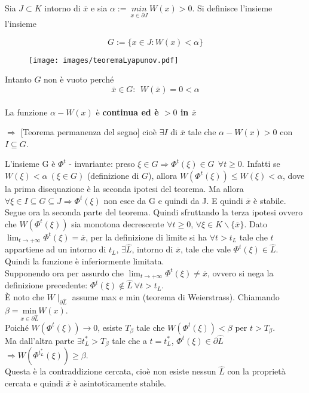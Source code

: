\documentclass[Main.tex]{subfiles}
\begin{document}
\begin{dm}

Sia $J \subset K$ intorno di $\overline x$ e sia $\alpha := \ \underset{x \in \partial J}{min} \ W(x)>0$. Si definisce l'insieme l'insieme

\begin{equation}
  G:= \{ x \in J : W(x) < \alpha \}
\end{equation}

\begin{figure}[H]
    \centering
  \texttt{[image: images/teoremaLyapunov.pdf]}
\end{figure}


Intanto $G$ non è vuoto perché
$$
\overline x \in G: \ \ W ( \overline x)=0< \alpha
$$
\\
La funzione $\alpha - W(x)$ è \textbf{continua ed è $>0$ in $\overline x$} 

$\Rightarrow$ [Teorema permanenza del segno] cioè $\exists I $ di $\overline x$ tale che $\alpha - W(x)>0$ con $I \subseteq G$. 

L'insieme G è $\Phi^t $ - invariante: preso $\xi \in G \Rightarrow \Phi^t(\xi) \in G \ \ \forall t \geq 0$. Infatti se $W(\xi) < \alpha \  (\xi \in G)$ (definizione di $G$), allora $W(\Phi^t(\xi)) \leq W (\xi) < \alpha$, dove la prima disequazione è la seconda ipotesi del teorema.
Ma allora $\forall \xi \in I \subseteq G \subseteq J \Rightarrow \Phi^t (\xi)$ non esce da G e quindi da J. E quindi $\overline x$ è stabile.
\bigskip\\
Segue ora la seconda parte del teorema. Quindi sfruttando la terza ipotesi ovvero che $W(\Phi^t(\xi))$ sia monotona decrescente $\forall t \geq 0$, $\forall \xi \in K \backslash \{\overline x \}$.
Dato $\lim_{t \rightarrow +\infty} \Phi^t (\xi) = \overline x$, per la definizione di limite si ha $\forall t>t_L$ tale che $t$ appartiene ad un intorno di $t_L$, $ \exists \hat{L} $, intorno di $\overline x$, tale che vale $\Phi^t ( \xi) \in \hat{L} $. Quindi la funzione è inferiormente limitata.\\
    Supponendo ora per assurdo che $\lim_{t \rightarrow +\infty} \Phi^t (\xi) \neq \overline x$, ovvero si nega la definizione precedente: $\Phi^t (\xi) \notin \hat{L} ~ \forall t > t_L$.\\
	È noto che $W\mid_{\partial \hat L}$ assume max e min (teorema di Weierstrass). Chiamando $\beta= \underset{x \in \partial \hat L}{\text{min}} W(x)$.\\
	Poiché $W(\Phi^t(\xi)) \rightarrow 0 $, esiste $T_\beta$ tale che $W(\Phi^t(\xi)) < \beta$ per $t >T_\beta$.\\
	Ma dall'altra parte $\exists t^*_L>T_\beta$ tale che a $t=t_L^*$, $\Phi^t (\xi) \in \partial \hat L $ $\Rightarrow W (\Phi^{t^*_L}(\xi)) \geq \beta$.\\ Questa è la contraddizione cercata, cioè non esiste nessun $\hat L$ con la proprietà cercata e quindi $\overline x$ è asintoticamente stabile.
\end{dm}
\end{document}
